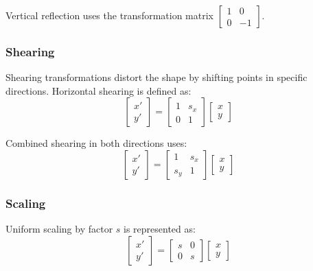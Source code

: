 \documentclass[a4paper, journal]{IEEEtran}
\begin{document}
Vertical reflection uses the transformation matrix $\begin{bmatrix} 1 & 0 \\ 0 & -1 \end{bmatrix}$.

\subsubsection{Shearing}
Shearing transformations distort the shape by shifting points in specific directions. Horizontal shearing is defined as:
\begin{equation}
    \begin{bmatrix} x' \\ y' \end{bmatrix} = \begin{bmatrix} 1 & s_x \\ 0 & 1 \end{bmatrix} \begin{bmatrix} x \\ y \end{bmatrix}
\end{equation}

Combined shearing in both directions uses:
\begin{equation}
    \begin{bmatrix} x' \\ y' \end{bmatrix} = \begin{bmatrix} 1 & s_x \\ s_y & 1 \end{bmatrix} \begin{bmatrix} x \\ y \end{bmatrix}
\end{equation}

\subsubsection{Scaling}
Uniform scaling by factor $s$ is represented as:
\begin{equation}
    \begin{bmatrix} x' \\ y' \end{bmatrix} = \begin{bmatrix} s & 0 \\ 0 & s \end{bmatrix} \begin{bmatrix} x \\ y \end{bmatrix}
\end{equation}
\end{document}

